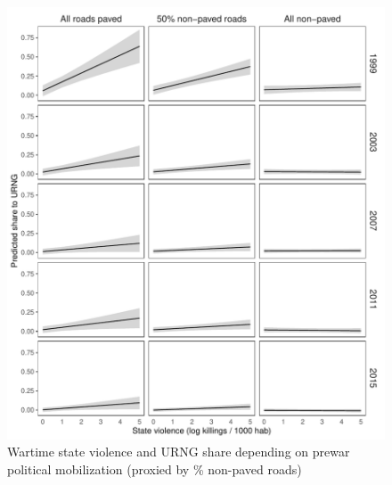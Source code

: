 \documentclass[a4paper, 12pt, notitlepage]{article}
\begin{document}
\begin{figure}[htb!]
  \centering
    \includegraphics[width = \textwidth]{img/pp_URNG_roads_year}

  \caption{Wartime state violence and URNG share depending on prewar political mobilization (proxied by \% non-paved roads)} \label{fig:pp_URNG_roads_yrs}

\end{figure}
\end{document}
